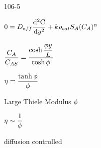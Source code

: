 \begin{mitframe}{106-5}
\begin{listone}
 	\item $0=\elecdisplace_{eff}\dfrac{\mathrm{d^2\conc}}{\mathrm{d}y^2}+\thermcond\dens_{cat}\entropy_{\helmholtz}(\conc_{\helmholtz})^n$
    \item $\dfrac{\conc_{\helmholtz}}{\conc_{\helmholtz\entropy}}=\dfrac{\cosh\dfrac{\eleccoeff{y}}{\length}}{\cosh\eleccoeff}$
    \item $\intrinsvisc=\dfrac{\tanh\eleccoeff}{\eleccoeff}$
    \item Large Thiele Modulus $\eleccoeff$
    	\begin{listthree}
        	\item $\intrinsvisc\sim\dfrac{1}{\eleccoeff}$
            \item diffusion controlled
        \end{listthree}
\end{listone}
\end{mitframe}